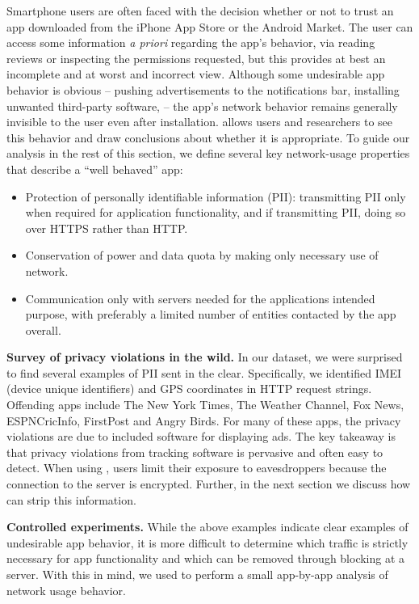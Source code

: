 
    Smartphone users are often faced with the decision whether or not to trust an app downloaded from the iPhone App Store or the Android Market.
    The user can access some information \emph{a priori} regarding the app's behavior, \eg{} via reading reviews or inspecting the permissions requested, but this provides at best an incomplete and at worst and incorrect view.
    Although some undesirable app behavior is obvious -- \eg{} pushing advertisements to the notifications bar, installing unwanted third-party software, \etc{} -- the app's network behavior remains generally invisible to the user even after installation. \meddle allows users and researchers to see this behavior and draw conclusions about whether it is appropriate. 
     To guide our analysis in the rest of this section, we define several key network-usage properties that describe a ``well behaved'' app:
    \begin{itemize}
        \item Protection of personally identifiable information (PII): transmitting PII only when required for application functionality, and if transmitting PII, doing so over HTTPS rather than HTTP.
        \item Conservation of power and data quota by making only necessary use of network.
        \item Communication only with servers needed for the applications intended purpose, with preferably a limited number of entities contacted by the app overall.
    \end{itemize}

\noindent\textbf{Survey of privacy violations in the wild.} In our dataset, we were surprised to find several examples of PII sent in the clear. Specifically, we identified IMEI (device unique identifiers) and 
GPS coordinates in HTTP request strings. Offending apps include The New York Times, The Weather Channel, Fox News, ESPNCricInfo, FirstPost and 
Angry Birds. For many of these apps, the privacy violations are due to included software for displaying ads. The key takeaway is that privacy 
violations from tracking software is pervasive and often easy to detect. When using \meddle, users limit their exposure to eavesdroppers 
because the connection to the \meddle server is encrypted. Further, in the next section we discuss how \meddle can strip this information. 
  
\noindent\textbf{Controlled experiments.} While the above examples indicate clear examples of undesirable app behavior, 
it is more difficult to determine which traffic is strictly necessary for app functionality and which can be removed through blocking 
at a \meddle server. 
    With this in mind, we used \meddle to perform a small app-by-app analysis of network usage behavior.
    
